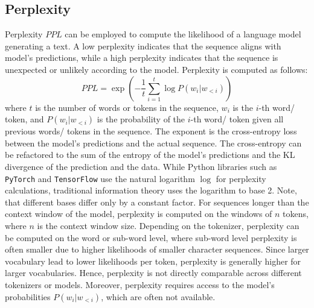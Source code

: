 \subsection{Perplexity}
\label{subsec:perplexity}

Perplexity $PPL$ can be employed to compute the likelihood of a language model generating a text.
A low perplexity indicates that the sequence aligns with model's predictions, 
while a high perplexity indicates that the sequence is unexpected or unlikely according to the model.
Perplexity is computed as follows:
\begin{equation}
    PPL = \exp\left(-\frac{1}{t}\sum_{i=1}^{t}\log P(w_i|w_{<i})\right)
\end{equation}
where $t$ is the number of words or tokens in the sequence, 
$w_i$ is the $i$-th word/ token, and $P(w_i|w_{<i})$ is the probability of the $i$-th word/ token given all previous words/ tokens in the sequence.
The exponent is the cross-entropy loss between the model's predictions and the actual sequence.
The cross-entropy can be refactored to the sum of the entropy of the model's predictions and the KL divergence of the prediction and the data.
While Python libraries such as \texttt{PyTorch} and \texttt{TensorFlow} use the natural logarithm $\log$ for perplexity calculations,
traditional information theory uses the logarithm to base 2. 
Note, that different bases differ only by a constant factor.
For sequences longer than the context window of the model, 
perplexity is computed on the windows of $n$ tokens, where $n$ is the context window size.
Depending on the tokenizer, perplexity can be computed on the word or sub-word level, 
where sub-word level perplexity is often smaller due to higher likelihoods of smaller character sequences.
Since larger vocabulary lead to lower likelihoods per token, perplexity is generally higher for larger vocabularies.
Hence, perplexity is not directly comparable across different tokenizers or models.
Moreover, perplexity requires access to the model's probabilities $P(w_i|w_{<i})$, which are often not available.
